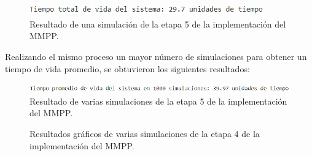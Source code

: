 \begin{enumerate}[label=\arabic*.]
\begin{figure}[H]
    \centering
    \includegraphics[width=0.9\textwidth]{imagenes/mmpp5.1.jpg}
    \caption{Resultado de una simulación de la etapa 5 de la implementación del MMPP.}
\end{figure}

Realizando el mismo proceso un mayor número de simulaciones para obtener un tiempo de vida promedio, se obtuvieron los siguientes resultados:

\begin{figure}[H]
    \centering
    \includegraphics[width=\textwidth]{imagenes/mmpp5.2.jpg}
    \caption{Resultado de varias simulaciones de la etapa 5 de la implementación del MMPP.}
\end{figure}

\begin{figure}[H]
    \centering
    \quad
    \caption{Resultados gráficos de varias simulaciones de la etapa 4 de la implementación del MMPP.}
\end{figure}


\end{enumerate}
